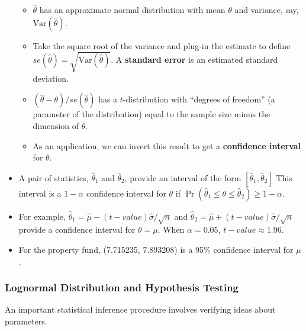 \documentclass[]{book}
\theoremstyle{definition}
\theoremstyle{definition}
\theoremstyle{definition}
\theoremstyle{remark}
\begin{document}
\begin{itemize}
  \begin{itemize}
  \item
    \(\hat{\theta}\) has an approximate normal distribution with mean
    \(\theta\) and variance, say, \(\mathrm{Var}(\hat{\theta})\).
  \item
    Take the square root of the variance and plug-in the estimate to
    define \(se(\hat{\theta}) = \sqrt{\mathrm{Var}(\hat{\theta})}\). A
    \textbf{standard error} is an estimated standard deviation.
  \item
    \((\hat{\theta}-\theta)/se(\hat{\theta})\) has a \(t\)-distribution
    with ``degrees of freedom'' (a parameter of the distribution) equal
    to the sample size minus the dimension of \(\theta\).
  \item
    As an application, we can invert this result to get a
    \textbf{confidence interval} for \(\theta\).
  \end{itemize}
\item
  A pair of statistics, \(\hat{\theta}_1\) and \(\hat{\theta}_2\),
  provide an interval of the form \([\hat{\theta}_1, \hat{\theta}_2]\)
  This interval is a \(1-\alpha\) confidence interval for \(\theta\) if
  \(\Pr\left(\hat{\theta}_1 \le \theta \le \hat{\theta}_2\right) \ge 1-\alpha.\)
\item
  For example,
  \(\hat{\theta}_1 = \hat{\mu} - (t-value) \hat{\sigma}/\sqrt{n}\) and
  \(\hat{\theta}_2 = \hat{\mu} + (t-value) \hat{\sigma}/\sqrt{n}\)
  provide a confidence interval for \(\theta=\mu\). When
  \(\alpha = 0.05\), \(t-value \approx 1.96\).
\item
  For the property fund, (7.715235, 7.893208) is a 95\% confidence
  interval for \(\mu\).
\end{itemize}

\subsubsection{Lognormal Distribution and Hypothesis
Testing}\label{lognormal-distribution-and-hypothesis-testing}

An important statistical inference procedure involves verifying ideas
about parameters.
\end{document}
